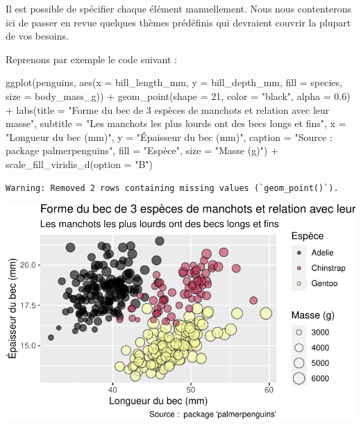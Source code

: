 \documentclass[
  a4paper,
  DIV=11,
  numbers=noendperiod,
  oneside]{scrreprt}
\newenvironment{Shaded}{}{}
\newcommand{\AttributeTok}[1]{\textcolor[rgb]{0.84,0.23,0.29}{#1}}
\newcommand{\DecValTok}[1]{\textcolor[rgb]{0.00,0.36,0.77}{#1}}
\newcommand{\FloatTok}[1]{\textcolor[rgb]{0.00,0.36,0.77}{#1}}
\newcommand{\FunctionTok}[1]{\textcolor[rgb]{0.44,0.26,0.76}{#1}}
\newcommand{\NormalTok}[1]{\textcolor[rgb]{0.14,0.16,0.18}{#1}}
\newcommand{\SpecialCharTok}[1]{\textcolor[rgb]{0.00,0.36,0.77}{#1}}
\newcommand{\StringTok}[1]{\textcolor[rgb]{0.01,0.18,0.38}{#1}}
\begin{document}
Il est possible de spécifier chaque élément manuellement. Nous nous
contenterons ici de passer en revue quelques thèmes prédéfinis qui
devraient couvrir la plupart de vos besoins.

Reprenons par exemple le code suivant :

\begin{Shaded}
\begin{Highlighting}[]
\FunctionTok{ggplot}\NormalTok{(penguins, }\FunctionTok{aes}\NormalTok{(}\AttributeTok{x =}\NormalTok{ bill\_length\_mm, }\AttributeTok{y =}\NormalTok{ bill\_depth\_mm,}
                     \AttributeTok{fill =}\NormalTok{ species, }\AttributeTok{size =}\NormalTok{ body\_mass\_g)) }\SpecialCharTok{+}
  \FunctionTok{geom\_point}\NormalTok{(}\AttributeTok{shape =} \DecValTok{21}\NormalTok{, }\AttributeTok{color =} \StringTok{"black"}\NormalTok{, }\AttributeTok{alpha =} \FloatTok{0.6}\NormalTok{) }\SpecialCharTok{+}
  \FunctionTok{labs}\NormalTok{(}\AttributeTok{title =} \StringTok{"Forme du bec de 3 espèces de manchots et relation avec leur masse"}\NormalTok{,}
       \AttributeTok{subtitle =} \StringTok{"Les manchots les plus lourds ont des becs longs et fins"}\NormalTok{,}
       \AttributeTok{x =} \StringTok{"Longueur du bec (mm)"}\NormalTok{,}
       \AttributeTok{y =} \StringTok{"Épaisseur du bec (mm)"}\NormalTok{,}
       \AttributeTok{caption =} \StringTok{"Source :  package \textquotesingle{}palmerpenguins\textquotesingle{}"}\NormalTok{,}
       \AttributeTok{fill =} \StringTok{"Espèce"}\NormalTok{,}
       \AttributeTok{size =} \StringTok{"Masse (g)"}\NormalTok{) }\SpecialCharTok{+}
  \FunctionTok{scale\_fill\_viridis\_d}\NormalTok{(}\AttributeTok{option =} \StringTok{"B"}\NormalTok{)}
\end{Highlighting}
\end{Shaded}

\begin{verbatim}
Warning: Removed 2 rows containing missing values (`geom_point()`).
\end{verbatim}

\includegraphics{03-visualization_files/figure-pdf/unnamed-chunk-108-1.pdf}
\end{document}

